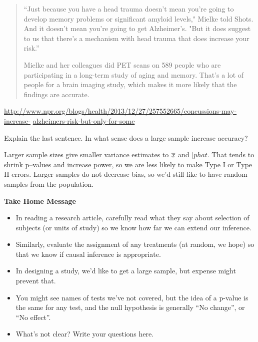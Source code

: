 \begin{enumerate}
{\begin{quotation}
``Just because you have a head trauma doesn't mean you're going to
develop memory problems or significant amyloid levels," Mielke told
Shots. And it doesn't mean you're going to get Alzheimer's. "But it
does suggest to us that there's a mechanism with head trauma that does
increase your risk.''

Mielke and her colleagues did PET scans on 589 people who are
participating in a long-term study of aging and memory. That's a lot
of people for a brain imaging study, which makes it more likely that
the findings are accurate. 
  \end{quotation}
}
\url{http://www.npr.org/blogs/health/2013/12/27/257552665/concussions-may-increase-}
\url{alzheimers-risk-but-only-for-some}

Explain the last sentence.  In what sense does a large sample increase accuracy?

\begin{students}
 \vspace{4cm}
\end{students}

\begin{key}
   Larger sample sizes give smaller variance estimates to $\overline{x}$ and
   $|phat$.  That tends to shrink p--values and increase power, so we
   are less likely to make Type I or Type II errors. Larger samples do
   not decrease bias, so we'd still like to have random samples from
   the population.
\end{key}


\end{enumerate}


\begin{center}
  {\large\bf Take Home Message}
\end{center}

\begin{itemize}
\item  In reading a research article, carefully read what they say
  about selection of subjects (or units of study) so we know how far
  we can extend our inference.
\item Similarly, evaluate the assignment of any treatments (at random,
  we hope) so that we know if causal inference is appropriate.
\item In designing a study, we'd like to get a large sample, but
  expense might prevent that.
\item You might see names of tests we've not covered, but the idea of
  a p-value is the same for any test, and the null hypothesis is
  generally ``No change'', or ``No effect''.
\item What's not clear?  Write your questions here.
\end{itemize}


